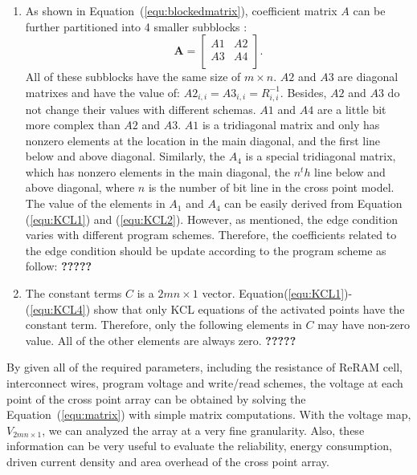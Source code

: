 \begin{enumerate}
  \item 
  As shown in Equation~(\ref{equ:blockedmatrix}), coefficient matrix $A$ can be further partitioned into 4 smaller subblocks :
    \begin{equation}\label{equ:blockedmatrix}
        \mathbf{A} = \left[
        \begin{array}{cc}
            A1 & A2  \\
            A3 & A4  \\
        \end{array} \right].
    \end{equation}
All of these subblocks have the same size of $m\times n$. $A2$ and $A3$ are diagonal matrixes and have the value of: $A2_{i,i} = A3_{i,i} = R_{i,i}^{-1}$. Besides, $A2$ and $A3$ do not change their values with different schemas. $A1$ and $A4$ are a little bit more complex than $A2$ and $A3$. $A1$ is a tridiagonal matrix and only has nonzero elements at the location in the main diagonal, and the first line below and above diagonal. Similarly, the $A_4$ is a special tridiagonal matrix, which has nonzero elements in the main diagonal, the $n^th$ line below and above diagonal, where $n$ is the number of bit line in the cross point model.
The value of the elements in $A_1$ and $A_4$ can be easily derived from Equation (\ref{equ:KCL1}) and (\ref{equ:KCL2}). However, as mentioned, the edge condition varies with different program schemes. 
Therefore, the coefficients related to the edge condition should be update according to the program scheme as follow:
\textbf{?????}
  
  \item The constant terms $C$ is a $2mn{\times}1$ vector. Equation(\ref{equ:KCL1})-(\ref{equ:KCL4}) show that only KCL equations of the activated points have the constant term. Therefore, only the following elements in $C$ may have non-zero value. All of the other elements are always zero.
      \textbf{?????}
\end{enumerate}

By given all of the required parameters, including the resistance of ReRAM cell, interconnect wires, program voltage and write/read schemes, the voltage at each point of the cross point array can be obtained by solving the Equation~(\ref{equ:matrix}) with simple matrix computations. With the voltage map, $V_{2mn{\times}1}$, we can analyzed the array at a very fine granularity. Also, these information can be very useful to evaluate the reliability, energy consumption, driven current density and area overhead of the cross point array.
